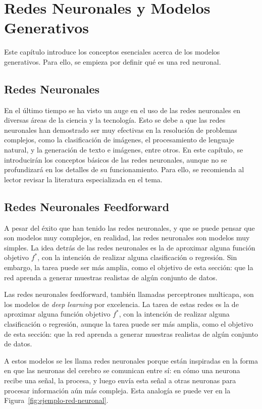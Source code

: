 \chapter{Redes Neuronales y Modelos Generativos}\label{chap:redes-neuronales-y-modelos-generativos}
{
Este capítulo introduce los conceptos esenciales acerca de los modelos generativos. Para ello, se empieza por definir qué es una red neuronal.
\section{Redes Neuronales}\label{sec:redes-Neuronales}
{
En el último tiempo se ha visto un auge en el uso de las redes neuronales en diversas áreas de la ciencia y la tecnología. Esto se debe a que las redes neuronales han demostrado ser muy efectivas en la resolución de problemas complejos, como la clasificación de imágenes, el procesamiento de lenguaje natural, y la generación de texto e imágenes, entre otros. En este capítulo, se introducirán los conceptos básicos de las redes neuronales, aunque no se profundizará en los detalles de su funcionamiento. Para ello, se recomienda al lector revisar la literatura especializada en el tema.

\section{Redes Neuronales Feedforward}\label{sec:redes-neuronales-feedforward}
{
    A pesar del éxito que han tenido las redes neuronales, y que se puede pensar que son modelos muy complejos, en realidad, las redes neuronales son modelos muy simples. La idea detrás de las redes neuronales es la de aproximar alguna función objetivo $f^\ast$, con la intención de realizar alguna clasificación o regresión. Sin embargo, la tarea puede ser más amplia, como el objetivo de esta sección: que la red aprenda a generar muestras realistas de algún conjunto de datos.


}



Las redes neuronales feedforward, también llamadas perceptrones multicapa, son los modelos de \textit{deep learning} por excelencia. La tarea de estas redes es la de aproximar alguna función objetivo $f^\ast$, con la intención de realizar alguna clasificación o regresión, aunque la tarea puede ser más amplia, como el objetivo de esta sección: que la red aprenda a generar muestras realistas de algún conjunto de datos.

A estos modelos se les llama redes neuronales porque están inspiradas en la forma en que las neuronas del cerebro se comunican entre sí: en cómo una neurona recibe una señal, la procesa, y luego envía esta señal a otras neuronas para procesar información aún más compleja. Esta analogía se puede ver en la Figura~\ref{fig:ejemplo-red-neuronal}.

}}
